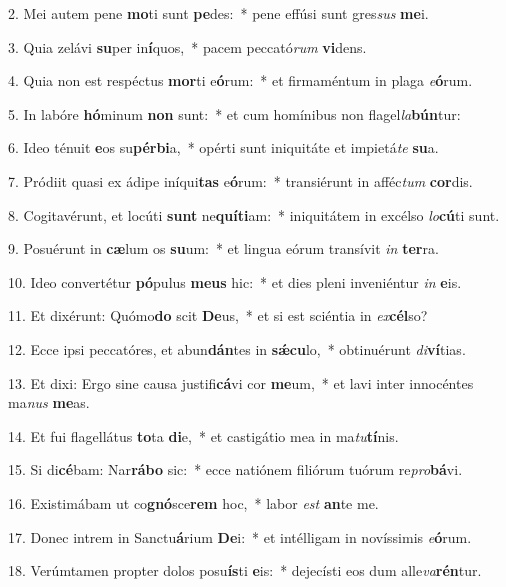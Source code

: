 2. Mei autem pene \textbf{mo}ti sunt \textbf{pe}des:~*  pene effúsi sunt gres\textit{sus} \textbf{me}i.\

3. Quia zelávi \textbf{su}per in\textbf{í}quos,~*  pacem peccató\textit{rum} \textbf{vi}dens.\

4. Quia non est respéctus \textbf{mor}ti e\textbf{ó}rum:~*  et firmaméntum in plaga \textit{e}\textbf{ó}rum.\

5. In labóre \textbf{hó}minum \textbf{non} sunt:~*  et cum homínibus non flagel\textit{la}\textbf{bún}tur:\

6. Ideo ténuit \textbf{e}os su\textbf{pér}\textbf{bi}a,~*  opérti sunt iniquitáte et impietá\textit{te} \textbf{su}a.\

7. Pródiit quasi ex ádipe iníqui\textbf{tas} e\textbf{ó}rum:~*  transiérunt in afféc\textit{tum} \textbf{cor}dis.\

8. Cogitavérunt, et locúti \textbf{sunt} ne\textbf{quí}\textbf{ti}am:~*  iniquitátem in excélso \textit{lo}\textbf{cú}ti sunt.\

9. Posuérunt in \textbf{cæ}lum os \textbf{su}um:~*  et lingua eórum transívit \textit{in} \textbf{ter}ra.\

10. Ideo convertétur \textbf{pó}pulus \textbf{me}\textbf{us} hic:~*  et dies pleni inveniéntur \textit{in} \textbf{e}is.\

11. Et dixérunt: Quómo\textbf{do} scit \textbf{De}us,~*  et si est sciéntia in \textit{ex}\textbf{cél}so?\

12. Ecce ipsi peccatóres, et abun\textbf{dán}tes in \textbf{sǽ}\textbf{cu}lo,~*  obtinuérunt \textit{di}\textbf{ví}tias.\

13. Et dixi: Ergo sine causa justifi\textbf{cá}vi cor \textbf{me}um,~*  et lavi inter innocéntes ma\textit{nus} \textbf{me}as.\

14. Et fui flagellátus \textbf{to}ta \textbf{di}e,~*  et castigátio mea in ma\textit{tu}\textbf{tí}nis.\

15. Si di\textbf{cé}bam: Nar\textbf{rá}\textbf{bo} sic:~*  ecce natiónem filiórum tuórum re\textit{pro}\textbf{bá}vi.\

16. Existimábam ut co\textbf{gnó}sce\textbf{rem} hoc,~*  labor \textit{est} \textbf{an}te me.\

17. Donec intrem in Sanctu\textbf{á}rium \textbf{De}i:~*  et intélligam in novíssimis \textit{e}\textbf{ó}rum.\

18. Verúmtamen propter dolos posu\textbf{ís}ti \textbf{e}is:~*  dejecísti eos dum alle\textit{va}\textbf{rén}tur.\

